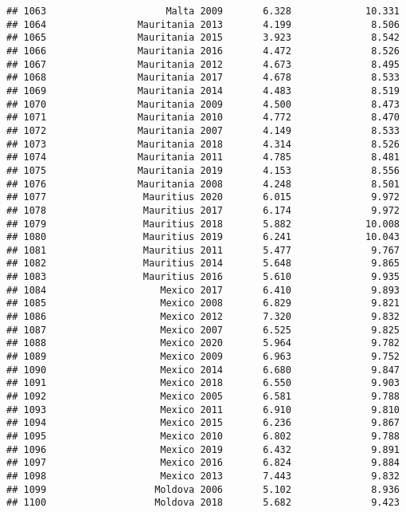 \documentclass[
]{article}
\begin{document}
\begin{verbatim}
## 1063                     Malta 2009       6.328             10.331
## 1064                Mauritania 2013       4.199              8.506
## 1065                Mauritania 2015       3.923              8.542
## 1066                Mauritania 2016       4.472              8.526
## 1067                Mauritania 2012       4.673              8.495
## 1068                Mauritania 2017       4.678              8.533
## 1069                Mauritania 2014       4.483              8.519
## 1070                Mauritania 2009       4.500              8.473
## 1071                Mauritania 2010       4.772              8.470
## 1072                Mauritania 2007       4.149              8.533
## 1073                Mauritania 2018       4.314              8.526
## 1074                Mauritania 2011       4.785              8.481
## 1075                Mauritania 2019       4.153              8.556
## 1076                Mauritania 2008       4.248              8.501
## 1077                 Mauritius 2020       6.015              9.972
## 1078                 Mauritius 2017       6.174              9.972
## 1079                 Mauritius 2018       5.882             10.008
## 1080                 Mauritius 2019       6.241             10.043
## 1081                 Mauritius 2011       5.477              9.767
## 1082                 Mauritius 2014       5.648              9.865
## 1083                 Mauritius 2016       5.610              9.935
## 1084                    Mexico 2017       6.410              9.893
## 1085                    Mexico 2008       6.829              9.821
## 1086                    Mexico 2012       7.320              9.832
## 1087                    Mexico 2007       6.525              9.825
## 1088                    Mexico 2020       5.964              9.782
## 1089                    Mexico 2009       6.963              9.752
## 1090                    Mexico 2014       6.680              9.847
## 1091                    Mexico 2018       6.550              9.903
## 1092                    Mexico 2005       6.581              9.788
## 1093                    Mexico 2011       6.910              9.810
## 1094                    Mexico 2015       6.236              9.867
## 1095                    Mexico 2010       6.802              9.788
## 1096                    Mexico 2019       6.432              9.891
## 1097                    Mexico 2016       6.824              9.884
## 1098                    Mexico 2013       7.443              9.832
## 1099                   Moldova 2006       5.102              8.936
## 1100                   Moldova 2018       5.682              9.423

\end{verbatim}
\end{document}
